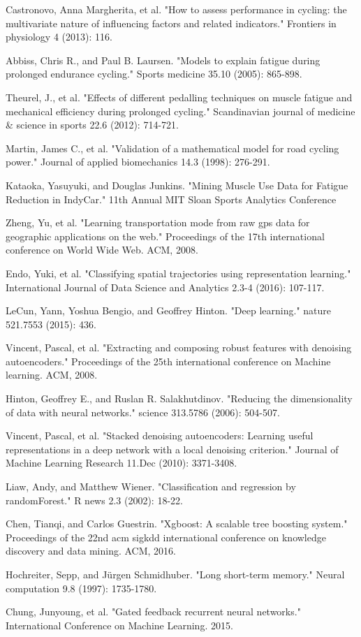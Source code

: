 \documentclass[runningheads]{llncs}
\begin{document}
\begin{thebibliography}{8}
 Castronovo, Anna Margherita, et al. "How to assess
	performance in cycling: the multivariate nature of influencing
	factors and related indicators." Frontiers in physiology 4
	(2013): 116.

 Abbiss, Chris R., and Paul B. Laursen. "Models to
	explain fatigue during prolonged endurance cycling." Sports
	medicine 35.10 (2005): 865-898.

 Theurel, J., et al. "Effects of different pedalling
	techniques on muscle fatigue and mechanical efficiency during
	prolonged cycling." Scandinavian journal of medicine \& science
	in sports 22.6 (2012): 714-721.

 Martin, James C., et al. "Validation of a mathematical
	model for road cycling power." Journal of applied biomechanics
	14.3 (1998): 276-291.

 Kataoka, Yasuyuki, and Douglas Junkins. "Mining Muscle
	Use Data for Fatigue Reduction in IndyCar." 11th Annual MIT
	Sloan Sports Analytics Conference

 Zheng, Yu, et al. "Learning transportation mode from raw
	gps data for geographic applications on the web." Proceedings of
	the 17th international conference on World Wide Web. ACM, 2008.
	
 Endo, Yuki, et al. "Classifying spatial trajectories
	using representation learning." International Journal of Data
	Science and Analytics 2.3-4 (2016): 107-117.

 LeCun, Yann, Yoshua Bengio, and Geoffrey Hinton. "Deep
	learning." nature 521.7553 (2015): 436.

 Vincent, Pascal, et al. "Extracting and composing
	robust features with denoising autoencoders." Proceedings of the
	25th international conference on Machine learning. ACM, 2008.

 Hinton, Geoffrey E., and Ruslan
	R. Salakhutdinov. "Reducing the dimensionality of data with
	neural networks." science 313.5786 (2006): 504-507.

 Vincent, Pascal, et al. "Stacked denoising
	autoencoders: Learning useful representations in a deep network
	with a local denoising criterion." Journal of Machine Learning
	Research 11.Dec (2010): 3371-3408.

 Liaw, Andy, and Matthew Wiener. "Classification and
	regression by randomForest." R news 2.3 (2002): 18-22.

 Chen, Tianqi, and Carlos Guestrin. "Xgboost: A scalable
	tree boosting system." Proceedings of the 22nd acm sigkdd
	international conference on knowledge discovery and data
	mining. ACM, 2016.

 Hochreiter, Sepp, and Jürgen Schmidhuber. "Long
	short-term memory." Neural computation 9.8 (1997): 1735-1780.

 Chung, Junyoung, et al. "Gated feedback recurrent
	neural networks." International Conference on Machine
	Learning. 2015.
\end{thebibliography}
\end{document}
